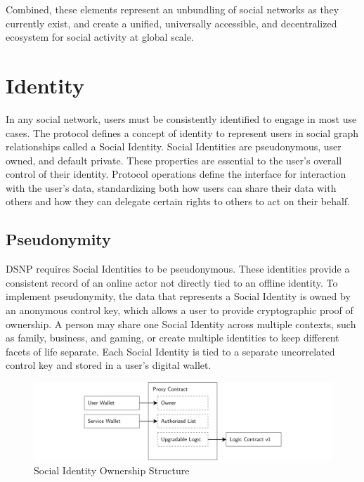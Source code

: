 \documentclass[12pt,letterpaper]{article}
\begin{document}
Combined, these elements represent an unbundling of social networks as they currently
exist, and create a unified, universally accessible, and decentralized ecosystem for
social activity at global scale.

\section{Identity}\label{sec:identity}

In any social network, users must be consistently identified to engage in most use cases.
The protocol defines a concept of identity to represent users in social graph relationships
called a Social Identity. Social Identities are pseudonymous,\cite{anon_terminology} user
owned, and default private. These properties are essential to the user's overall control of
their identity. Protocol operations define the interface for interaction with the user's
data, standardizing both how users can share their data with others and how they can
delegate certain rights to others to act on their behalf.

\subsection{Pseudonymity}\label{sec:pseudonymity}

DSNP requires Social Identities to be pseudonymous. These identities provide a consistent
record of an online actor not directly tied to an offline identity. To implement
pseudonymity, the data that represents a Social Identity is owned by an anonymous control
key, which allows a user to provide cryptographic proof of ownership. A person may share one
Social Identity across multiple contexts, such as family, business, and gaming, or create
multiple identities to keep different facets of life separate. Each Social Identity is tied
to a separate uncorrelated control key and stored in a user's digital wallet.

\begin{figure}
	\includegraphics[width=\linewidth]{figures/Social Identity Ownership Structure.png}
	\caption{Social Identity Ownership Structure}
	\label{fig:1}
\end{figure}
\end{document}
